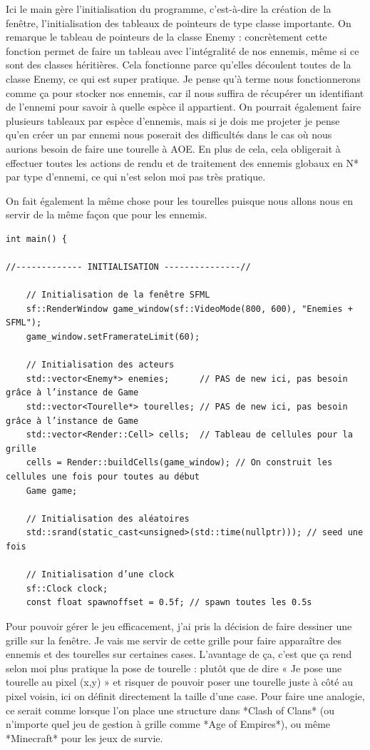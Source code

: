 Ici le main gère l’initialisation du programme, c’est-à-dire la création de la fenêtre, l’initialisation des tableaux de pointeurs de type classe importante. On remarque le tableau de pointeurs de la classe Enemy : concrètement cette fonction permet de faire un tableau avec l’intégralité de nos ennemis, même si ce sont des classes héritières. Cela fonctionne parce qu’elles découlent toutes de la classe Enemy, ce qui est super pratique. Je pense qu’à terme nous fonctionnerons comme ça pour stocker nos ennemis, car il nous suffira de récupérer un identifiant de l’ennemi pour savoir à quelle espèce il appartient.  
On pourrait également faire plusieurs tableaux par espèce d’ennemis, mais si je dois me projeter je pense qu’en créer un par ennemi nous poserait des difficultés dans le cas où nous aurions besoin de faire une tourelle à AOE. En plus de cela, cela obligerait à effectuer toutes les actions de rendu et de traitement des ennemis globaux en N* par type d’ennemi, ce qui n’est selon moi pas très pratique.  

On fait également la même chose pour les tourelles puisque nous allons nous en servir de la même façon que pour les ennemis.

\begin{lstlisting}
int main() {

//------------- INITIALISATION ---------------//

    // Initialisation de la fenêtre SFML
    sf::RenderWindow game_window(sf::VideoMode(800, 600), "Enemies + SFML");
    game_window.setFramerateLimit(60);

    // Initialisation des acteurs
    std::vector<Enemy*> enemies;      // PAS de new ici, pas besoin grâce à l’instance de Game
    std::vector<Tourelle*> tourelles; // PAS de new ici, pas besoin grâce à l’instance de Game
    std::vector<Render::Cell> cells;  // Tableau de cellules pour la grille
    cells = Render::buildCells(game_window); // On construit les cellules une fois pour toutes au début
    Game game;                       

    // Initialisation des aléatoires
    std::srand(static_cast<unsigned>(std::time(nullptr))); // seed une fois

    // Initialisation d’une clock
    sf::Clock clock;
    const float spawnoffset = 0.5f; // spawn toutes les 0.5s
\end{lstlisting}

\newpage

Pour pouvoir gérer le jeu efficacement, j’ai pris la décision de faire dessiner une grille sur la fenêtre. Je vais me servir de cette grille pour faire apparaître des ennemis et des tourelles sur certaines cases.  
L’avantage de ça, c’est que ça rend selon moi plus pratique la pose de tourelle : plutôt que de dire « Je pose une tourelle au pixel (x,y) » et risquer de pouvoir poser une tourelle juste à côté au pixel voisin, ici on définit directement la taille d’une case.  
Pour faire une analogie, ce serait comme lorsque l’on place une structure dans *Clash of Clans* (ou n’importe quel jeu de gestion à grille comme *Age of Empires*), ou même *Minecraft* pour les jeux de survie.  

